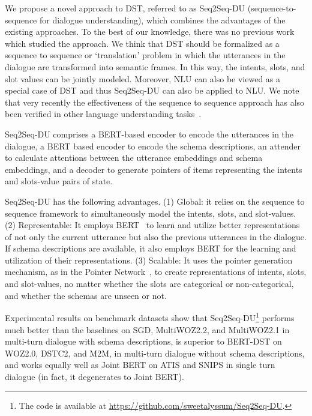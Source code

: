 \documentclass[11pt]{article}
\begin{document}
We propose a novel approach to DST, referred to as Seq2Seq-DU (sequence-to-sequence for dialogue understanding), which combines the advantages of the existing approaches. To the best of our knowledge, there was no previous work which studied the approach. We think that DST should be formalized as a sequence to sequence or `translation' problem in which the utterances in the dialogue are transformed into semantic frames. In this way, the intents, slots, and slot values can be jointly modeled. Moreover, NLU can also be viewed as a special case of DST and thus Seq2Seq-DU can also be applied to NLU. We note that very recently the effectiveness of the sequence to sequence approach has also been verified in other language understanding tasks~\cite{paolini2021structured}.

Seq2Seq-DU comprises a BERT-based encoder to encode the utterances in the dialogue, a BERT based encoder to encode the schema descriptions, an attender to calculate attentions between the utterance embeddings and schema embeddings, and a decoder to generate pointers of items representing the intents and slots-value pairs of state.

Seq2Seq-DU has the following advantages. (1) Global: it relies on the sequence to sequence framework to simultaneously model the intents, slots, and slot-values.  (2) Representable: It employs BERT~\cite{devlin2018bert} to learn and utilize better representations of not only the current utterance but also the previous utterances in the dialogue. If schema descriptions are available, it also employs BERT for the learning and utilization of their representations. (3) Scalable: It uses the pointer generation mechanism, as in the Pointer Network~\cite{vinyals2015pointer}, to create representations of intents, slots, and slot-values, no matter whether the slots are categorical or non-categorical, and whether the schemas are unseen or not.

Experimental results on benchmark datasets show that Seq2Seq-DU\footnote{The code is available at \url{https://github.com/sweetalyssum/Seq2Seq-DU}.} performs much better than the baselines on SGD, MultiWOZ2.2, and MultiWOZ2.1 in multi-turn dialogue with schema descriptions, is superior to BERT-DST on WOZ2.0, DSTC2, and M2M, in multi-turn dialogue without schema descriptions, and works equally well as Joint BERT on ATIS and SNIPS in single turn dialogue (in fact, it degenerates to Joint BERT). 
\end{document}
